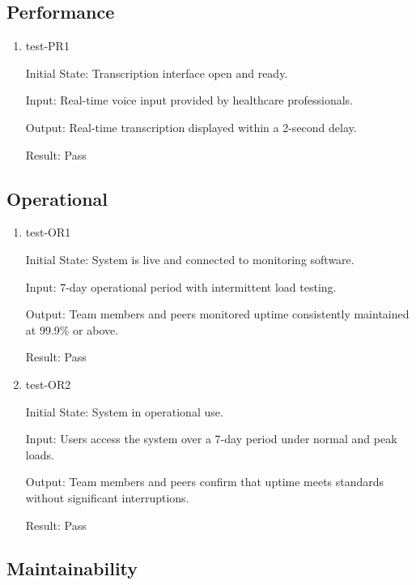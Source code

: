 \documentclass[12pt, titlepage]{article}
\begin{document}
\subsection{Performance} \label{section:4.3}

\begin{enumerate}
\item test-PR1 \label{test-PR1}

Initial State: Transcription interface open and ready.

Input: Real-time voice input provided by healthcare professionals.

Output: Real-time transcription displayed within a 2-second delay.

Result: Pass 

\end{enumerate}

\subsection{Operational} \label{section:4.4}

\begin{enumerate}
\item test-OR1 \label{test-OR1}

Initial State: System is live and connected to monitoring software.

Input: 7-day operational period with intermittent load testing.

Output: Team members and peers monitored uptime consistently maintained at 99.9\% or above.

Result: Pass

\item test-OR2 \label{test-OR2}

Initial State: System in operational use.

Input: Users access the system over a 7-day period under normal and peak loads.

Output: Team members and peers confirm that uptime meets standards without significant interruptions.

Result: Pass

\end{enumerate}

\subsection{Maintainability} \label{section:4.5}
\end{document}

